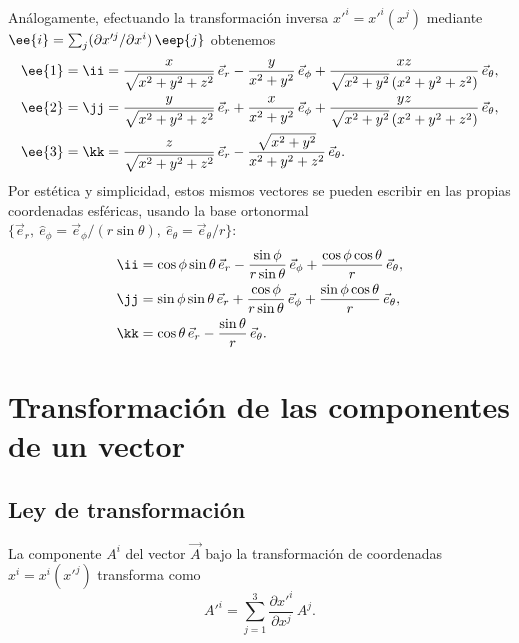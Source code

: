 Análogamente, efectuando la transformación inversa $x'^i=x'^i(x^j)$ mediante $\ee{i}=\sum_j (\partial x'^j/\partial x^i)\,\eep{j}$ obtenemos
\begin{align}
\ee{1} = \ii &= \frac{x}{\sqrt{x^2+y^2+z^2}}\,\vec e_r - \frac{y}{x^2+y^2}\,\vec e_\phi + \frac{xz}{\sqrt{x^2+y^2}\left(x^2+y^2+z^2\right)}\,\vec e_\theta , \\
\ee{2} = \jj &= \frac{y}{\sqrt{x^2+y^2+z^2}}\,\vec e_r + \frac{x}{x^2+y^2}\,\vec e_\phi + \frac{yz}{\sqrt{x^2+y^2}\left(x^2+y^2+z^2\right)}\,\vec e_\theta , \\
\ee{3} = \kk &= \frac{z}{\sqrt{x^2+y^2+z^2}}\,\vec e_r - \frac{\sqrt{x^2+y^2}}{x^2+y^2+z^2}\,\vec e_\theta .
\end{align}
Por estética y simplicidad, estos mismos vectores se pueden escribir en las propias coordenadas esféricas, usando la base ortonormal $\{\vec e_r,\ \hat e_\phi=\vec e_\phi/(r\sin\theta),\ \hat e_\theta=\vec e_\theta/r\}$:
\begin{align}
\ii &= \cos\phi\sin\theta\,\vec e_r - \frac{\sin\phi}{r\sin\theta}\,\vec e_\phi + \frac{\cos\phi\cos\theta}{r}\,\vec e_\theta, \\
\jj &= \sin\phi\sin\theta\,\vec e_r + \frac{\cos\phi}{r\sin\theta}\,\vec e_\phi + \frac{\sin\phi\cos\theta}{r}\,\vec e_\theta, \\
\kk &= \cos\theta\,\vec e_r - \frac{\sin\theta}{r}\,\vec e_\theta .
\end{align}

\section{Transformación de las componentes de un vector}

\subsection{Ley de transformación}

\begin{proposicion}\label{prop:comp}
La componente $A^i$ del vector $\vec A$ bajo la transformación de coordenadas $x^i=x^i(x'^j)$ transforma como
\begin{equation}
A'^i = \sum_{j=1}^{3} \frac{\partial x'^i}{\partial x^j}\, A^j .
\end{equation}
\end{proposicion}

